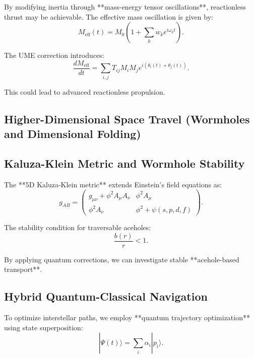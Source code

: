 \documentclass[12]{amsart}
\theoremstyle{plain}
\begin{document}
By modifying inertia through **mass-energy tensor oscillations**, reactionless thrust may be achievable. The effective mass oscillation is given by:
\begin{equation}
M_{\text{eff}}(t) = M_0 \left(1 + \sum_{k} w_k e^{i \omega_k t} \right).
\end{equation}

The UME correction introduces:
\begin{equation}
\frac{d M_{\text{eff}}}{dt} = \sum_{i,j} T_{ij} M_i M_j e^{i (\theta_i(t) + \theta_j(t))}.
\end{equation}

This could lead to advanced reactionless propulsion.

\subsection{Higher-Dimensional Space Travel (Wormholes and Dimensional Folding)}

\subsection{Kaluza-Klein Metric and Wormhole Stability}

The **5D Kaluza-Klein metric** extends Einstein’s field equations as:
\begin{equation}
g_{AB} =
\begin{pmatrix}
g_{\mu\nu} + \phi^2 A_{\mu} A_{\nu} & \phi^2 A_{\mu} \\
\phi^2 A_{\nu} & \phi^2 + \psi(s, p, d, f)
\end{pmatrix}.
\end{equation}

The stability condition for traversable aceholes:
\begin{equation}
\frac{b(r)}{r} < 1.
\end{equation}

By applying quantum corrections, we can investigate stable **acehole-based transport**.

\subsection{Hybrid Quantum-Classical Navigation}

To optimize interstellar paths, we employ **quantum trajectory optimization** using state superposition:
\begin{equation}
| \Psi (t) \rangle = \sum_{i} \alpha_i | p_i \rangle.
\end{equation}
\end{document}
